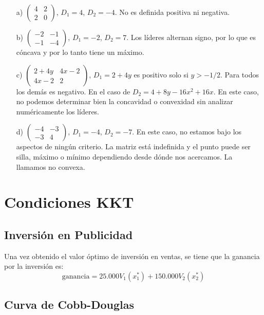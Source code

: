 \documentclass[12pt]{article}
\begin{document}
\begin{itemize}
    \item[a)] $\begin{pmatrix} 4 & 2 \\ 2 & 0 \end{pmatrix}$, $D_1 = 4$, $D_2 = -4$. No es definida positiva ni negativa.
    \item[b)] $\begin{pmatrix} -2 & -1 \\ -1 & -4 \end{pmatrix}$, $D_1 = -2$, $D_2 = 7$. Los líderes alternan signo, por lo que es cóncava y por lo tanto tiene un máximo.
    \item[c)] $\begin{pmatrix} 2+4y & 4x-2 \\ 4x-2 & 2 \end{pmatrix}$, $D_1 = 2+4y$ es positivo solo si $y > -1/2$. Para todos los demás es negativo. En el caso de $D_2 = 4 + 8y - 16x^2 + 16x$. En este caso, no podemos determinar bien la concavidad o convexidad sin analizar numéricamente los líderes.
    \item[d)] $\begin{pmatrix} -4 & -3 \\ -3 & 4 \end{pmatrix}$, $D_1 = -4$, $D_2 = -7$. En este caso, no estamos bajo los aspectos de ningún criterio. La matriz está indefinida y el punto puede ser silla, máximo o mínimo dependiendo desde dónde nos acercamos. La llamamos no convexa.
\end{itemize}

\section*{Condiciones KKT}

\subsection{Inversión en Publicidad}

Una vez obtenido el valor óptimo de inversión en ventas, se tiene que la ganancia por la inversión es:
\begin{equation}
   \text{ganancia} = 25.000 V_1(x_1^{*}) + 150.000 V_2(x_2^{*}) 
\end{equation}

\subsection{Curva de Cobb-Douglas}
\end{document}
